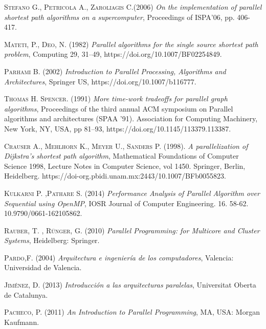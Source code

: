 \documentclass[11pt]{article}
\begin{document}
\begin{thebibliography}{x}
  \textsc{Stefano G., Petricola A., Zaroliagis C.(2006)} 
 	\textit{On the implementation of parallel shortest path algorithms on a supercomputer}, Proceedings of ISPA’06, pp. 406-417.

  \textsc{Mateti, P., Deo, N. (1982)} 
 	\textit{Parallel algorithms for the single source shortest path problem}, Computing 29, 31–49, https://doi.org/10.1007/BF02254849.

  \textsc{Parhami B. (2002)} 
 	\textit{Introduction to Parallel Processing, Algorithms and Architectures}, Springer US, https://doi.org/10.1007/b116777.

  \textsc{Thomas H. Spencer. (1991)} 
 	\textit{More time-work tradeoffs for parallel graph algorithms}, Proceedings of the third annual ACM symposium on Parallel algorithms and architectures (SPAA '91). Association for Computing Machinery, New York, NY, USA, pp 81–93, https://doi.org/10.1145/113379.113387.

  \textsc{Crauser A., Mehlhorn K., Meyer U., Sanders P. (1998).} 
 	\textit{ A parallelization of Dijkstra's shortest path algorithm}, Mathematical Foundations of Computer Science 1998, Lecture Notes in Computer Science, vol 1450. Springer, Berlin, Heidelberg. https://doi-org.pbidi.unam.mx:2443/10.1007/BFb0055823.

  \textsc{Kulkarni P. ,Pathare S.  (2014)} 
 	\textit{Performance Analysis of Parallel Algorithm over Sequential using OpenMP}, IOSR Journal of Computer Engineering. 16. 58-62. 10.9790/0661-162105862. 
 	
 \textsc{Rauber, T. , Rünger, G. (2010)}
	\textit{Parallel Programming: for Multicore and Cluster Systems},  Heidelberg: Springer.
	
\textsc{Pardo,F. (2004)}
	\textit{Arquitectura e ingeniería de los computadores},  Valencia: Universidad de Valencia.

\textsc{Jiménez, D. (2013)}
	\textit{Introducción a las arquitecturas paralelas},  Universitat Oberta de Catalunya.
	
\textsc{Pacheco, P. (2011)}
	\textit{An Introduction to Parallel Programming},  MA, USA: Morgan Kaufmann.

\end{thebibliography}
\end{document}
